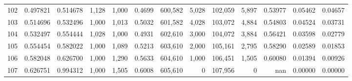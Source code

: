 \begin{tabular}{rrrrrrrrrrrrr}
102 &  0.497821 &  0.514678 &   1,128 &  1,000 &                                     0.4699 &  600,582 &    5,028 &  102,059 &    5,897 &  0.53977 &  0.05462 &  0.04657 \\
103 &  0.514696 &  0.532496 &   1,000 &  1,013 &                                     0.5032 &  601,582 &    4,028 &  103,072 &    4,884 &  0.54803 &  0.04524 &  0.03731 \\
104 &  0.532497 &  0.554444 &   1,028 &  1,000 &                                     0.4931 &  602,610 &    3,000 &  104,072 &    3,884 &  0.56421 &  0.03598 &  0.02779 \\
105 &  0.554454 &  0.582022 &   1,000 &  1,089 &                                     0.5213 &  603,610 &    2,000 &  105,161 &    2,795 &  0.58290 &  0.02589 &  0.01853 \\
106 &  0.582048 &  0.626700 &   1,000 &  1,290 &                                     0.5633 &  604,610 &    1,000 &  106,451 &    1,505 &  0.60080 &  0.01394 &  0.00926 \\
107 &  0.626751 &  0.994312 &   1,000 &  1,505 &                                     0.6008 &  605,610 &        0 &  107,956 &        0 &      nan &  0.00000 &  0.00000 \\
\bottomrule
\end{tabular}
